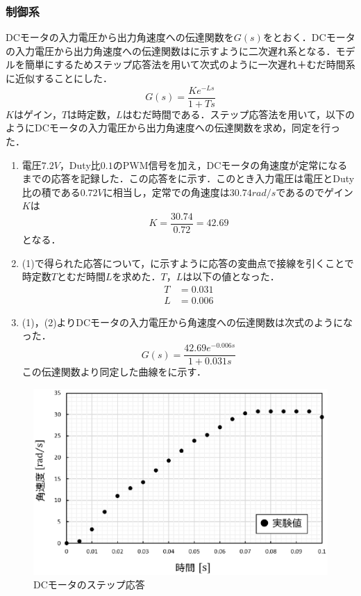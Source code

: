 \subsubsection{制御系}
DCモータの入力電圧から出力角速度への伝達関数を$G(s)$をとおく．DCモータの入力電圧から出力角速度への伝達関数はに示すように二次遅れ系となる．モデルを簡単にするためステップ応答法を用いて次式のように一次遅れ＋むだ時間系に近似することにした．  
\begin{equation}
 G(s)=\frac{Ke^{-Ls}}{1+Ts}
\end{equation} 
$K$はゲイン，$T$は時定数，$L$はむだ時間である．ステップ応答法を用いて，以下のようにDCモータの入力電圧から出力角速度への伝達関数を求め，同定を行った．

\begin{enumerate}
\item 電圧$7.2\unit{V}$，Duty比$0.1$のPWM信号を加え，DCモータの角速度が定常になるまでの応答を記録した．この応答をに示す．このとき入力電圧は電圧とDuty比の積である$0.72\unit{V}$に相当し，定常での角速度は$30.74\unit{rad/s}$であるのでゲイン$K$は
\begin{equation}
 K=\frac{30.74}{0.72}=42.69
\end{equation}
となる．
\item (1)で得られた応答について，に示すように応答の変曲点で接線を引くことで時定数$T$とむだ時間$L$を求めた．$T$，$L$は以下の値となった．
\begin{align}
 T&=0.031 \\
 L&=0.006
\end{align}
\item(1)，(2)よりDCモータの入力電圧から角速度への伝達関数は次式のようになった．
\begin{equation}
 G(s)=\frac{42.69e^{-0.006s}}{1+0.031s}
\end{equation} 
この伝達関数より同定した曲線をに示す．
\end{enumerate}

\begin{figure}[htb]
  \centering
    \includegraphics[width=0.7\hsize]{picture/eps/dcmotor_response.eps}
  \caption{DCモータのステップ応答}
  \label{fig::dcmotor_response}
  
\end{figure}

